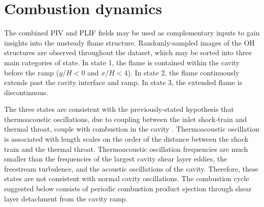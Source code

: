 \section*{Combustion dynamics}\label{sec:ch3_cavity_dynamics}
The combined PIV and PLIF fields may be used as complementary inputs to gain insights into the unsteady flame structure. Randomly-sampled images of the OH structures are observed throughout the dataset, which may be sorted into three main categories of state. In state 1, the flame is contained within the cavity before the ramp ($y/H<0$ and $x/H<4$). In state 2, the flame continuously extends past the cavity interface and ramp. In state 3, the extended flame is discontinuous.

The three states are consistent with the previously-stated hypothesis that thermoacoustic oscillations, due to coupling between the inlet shock-train and thermal throat, couple with combustion in the cavity \citep{WangWangSun2014, TuttleCarterHsu2014, Kirik2017, AllisonFredericksonKirikEtAl2017}.  Thermoacoustic oscillation is associated with length scales on the order of the distance between the shock train and the thermal throat. Thermoacoustic oscillation frequencies are much smaller than the frequencies of the largest cavity shear layer eddies, the freestream turbulence, and the acoustic oscillations of the cavity. Therefore, these states are not consistent with normal cavity oscillations.   The combustion cycle suggested below consists of periodic combustion product ejection through shear layer detachment from the cavity ramp. 

